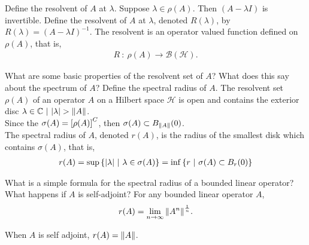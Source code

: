 \documentclass[avery5388,grid,frame]{flashcards}
\newcommand{\f}[3]{#1\ :\ #2 \rightarrow #3}
\def\Cx{\mathbb{C}}
\def\hilb{\mathcal{H}}
\begin{document}
\begin{flashcard}
    {Define the resolvent of $A$ at $\lambda$.}
    Suppose $\lambda \in \rho(A)$.  Then $(A - \lambda I)$ is invertible.  Define the resolvent of $A$ at $\lambda$, denoted $R(\lambda)$, by $R(\lambda) = (A - \lambda I)^{-1}$.  The resolvent is an operator valued function defined on $\rho(A)$, that is,
    \begin{align*}
        \f{R}{\rho(A)}{\mathcal{B}(\hilb)}.
    \end{align*}
\end{flashcard}

\begin{flashcard}
    {What are some basic properties of the resolvent set of $A$?  What does this say about the spectrum of $A$?  Define the spectral radius of $A$.}
    The resolvent set $\rho(A)$ of an operator $A$ on a Hilbert space $\hilb$ is open and contains the exterior disc $\lambda \in \Cx\ |\ \abs{\lambda} > \norm{A}$. \\

    Since the $\sigma(A) = \qty[\rho(A)]^C$, then $\sigma(A) \subset B_{\norm{A}}(0)$. \\

    The spectral radius of $A$, denoted $r(A)$, is the radius of the smallest disk which contains $\sigma(A)$, that is,
    \begin{align*}
        r(A) = \sup\left\{\abs{\lambda}\ |\ \lambda \in \sigma(A)\right\} = \inf\left\{r\ |\ \sigma(A) \subset B_r(0)\right\}
    \end{align*}
\end{flashcard}

\begin{flashcard}
    {What is a simple formula for the spectral radius of a bounded linear operator?  What happens if $A$ is self-adjoint?}
    For any bounded linear operator $A$,
    \begin{align*}
        r(A) = \lim_{n\rightarrow \infty} \norm{A^n}^{\frac{1}{n}}.
    \end{align*}

    When $A$ is self adjoint, $r(A) = \norm{A}$.
\end{flashcard}
\end{document}
